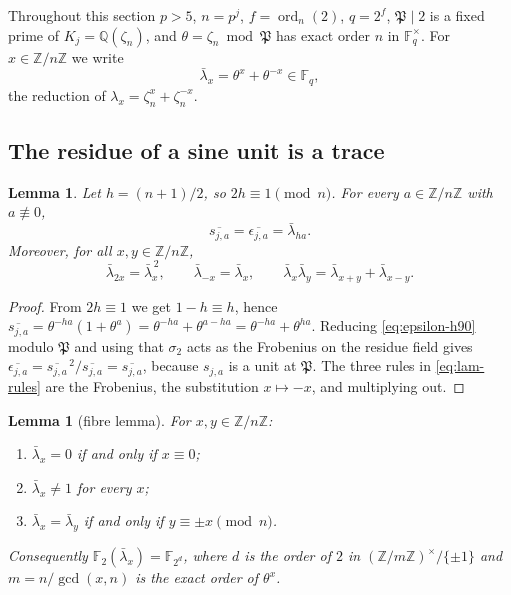 \documentclass[a4paper]{article}
\newtheorem{lemma}[theorem]{Lemma}
\newcommand{\F}{\mathbb{F}}
\newcommand{\Z}{\mathbb{Z}}
\newcommand{\Q}{\mathbb{Q}}
\newcommand{\ord}[2][]{\operatorname{ord}_{#1}\!\left(#2\right)}
\begin{document}
Throughout this section $p>5$, $n=p^{j}$, $f=\ord[n]{2}$, $q=2^{f}$,
$\mathfrak P\mid2$ is a fixed prime of $K_j=\Q(\zeta_n)$, and
$\theta=\zeta_n\bmod\mathfrak P$ has exact order $n$ in $\F_q^\times$.
For $x\in\Z/n\Z$ we write
\[
	\bar\lambda_x=\theta^{x}+\theta^{-x}\in\F_{q},
\]
the reduction of $\lambda_x=\zeta_n^{x}+\zeta_n^{-x}$.

\subsection{The residue of a sine unit is a trace}

\begin{lemma}\label{lem:sine-trace}
	Let $h=(n+1)/2$, so $2h\equiv1\pmod n$.  For every $a\in\Z/n\Z$ with
	$a\not\equiv0$,
	\[
		\overline{s_{j,a}}=\overline{\epsilon_{j,a}}=\bar\lambda_{ha}.
	\]
	Moreover, for all $x,y\in\Z/n\Z$,
	\begin{equation}\label{eq:lam-rules}
		\bar\lambda_{2x}=\bar\lambda_x^{\,2},
		\qquad
		\bar\lambda_{-x}=\bar\lambda_{x},
		\qquad
		\bar\lambda_x\bar\lambda_y=\bar\lambda_{x+y}+\bar\lambda_{x-y}.
	\end{equation}
\end{lemma}

\begin{proof}
	From $2h\equiv1$ we get $1-h\equiv h$, hence
	$\overline{s_{j,a}}=\theta^{-ha}(1+\theta^{a})
	=\theta^{-ha}+\theta^{a-ha}=\theta^{-ha}+\theta^{ha}$.
	Reducing \eqref{eq:epsilon-h90} modulo $\mathfrak P$ and using that
	$\sigma_2$ acts as the Frobenius on the residue field gives
	$\overline{\epsilon_{j,a}}=\overline{s_{j,a}}^{\,2}/\overline{s_{j,a}}
	=\overline{s_{j,a}}$, because $s_{j,a}$ is a unit at $\mathfrak P$.
	The three rules in \eqref{eq:lam-rules} are the Frobenius, the
	substitution $x\mapsto-x$, and multiplying out.
\end{proof}

\begin{lemma}[fibre lemma]\label{lem:fibre}
	For $x,y\in\Z/n\Z$:
	\begin{enumerate}
		\item $\bar\lambda_x=0$ if and only if $x\equiv0$;
		\item $\bar\lambda_x\ne1$ for every $x$;
		\item $\bar\lambda_x=\bar\lambda_y$ if and only if
		      $y\equiv\pm x\pmod n$.
	\end{enumerate}
	Consequently $\F_2(\bar\lambda_x)=\F_{2^{d}}$, where $d$ is the order
	of $2$ in $(\Z/m\Z)^{\times}/\{\pm1\}$ and $m=n/\gcd(x,n)$ is the exact
	order of $\theta^{x}$.
\end{lemma}
\end{document}
